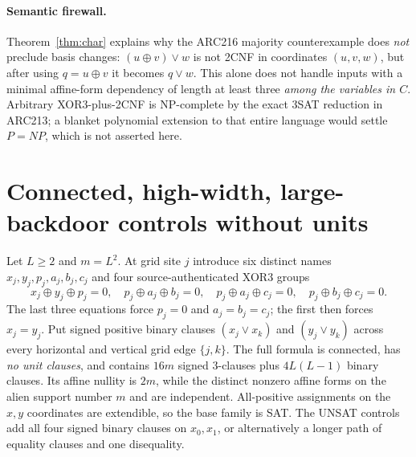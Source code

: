 \documentclass[11pt]{article}
\begin{document}
\paragraph{Semantic firewall.}
Theorem~\ref{thm:char} explains why the ARC216 majority counterexample
does \emph{not} preclude basis changes: $(u\oplus v)\vee w$ is not 2CNF
in coordinates $(u,v,w)$, but after using $q=u\oplus v$ it becomes
$q\vee w$. This alone does not handle inputs with a minimal affine-form
dependency of length at least three \emph{among the variables in $C$}.
Arbitrary XOR3-plus-2CNF is NP-complete by the exact 3SAT reduction in
ARC213; a blanket polynomial extension to that entire language would
settle $P=NP$, which is not asserted here.

\section{Connected, high-width, large-backdoor controls without units}
Let $L\ge2$ and $m=L^2$. At grid site $j$ introduce six distinct names
$x_j,y_j,p_j,a_j,b_j,c_j$ and four source-authenticated XOR3 groups
\[
 x_j\oplus y_j\oplus p_j=0,\quad
 p_j\oplus a_j\oplus b_j=0,\quad
 p_j\oplus a_j\oplus c_j=0,\quad
 p_j\oplus b_j\oplus c_j=0.
\tag{4}
\]
The last three equations force $p_j=0$ and $a_j=b_j=c_j$;
the first then forces $x_j=y_j$. Put signed positive binary clauses
$(x_j\vee x_k)$ and $(y_j\vee y_k)$ across every horizontal and vertical
grid edge $\{j,k\}$. The full formula is connected, has \emph{no unit
clauses}, and contains $16m$ signed 3-clauses plus $4L(L-1)$ binary clauses.
Its affine nullity is $2m$, while the distinct nonzero affine forms on the
alien support number $m$ and are independent. All-positive assignments
on the $x,y$ coordinates are extendible, so the base family is SAT.
The UNSAT controls add all four signed binary clauses on $x_0,x_1$,
or alternatively a longer path of equality clauses and one disequality.
\end{document}
